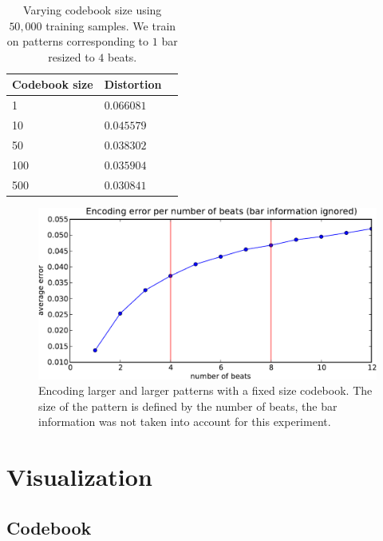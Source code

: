 \documentclass{article}
\begin{document}
\begin{table}
\begin{center}
\begin{tabular}{llc}
\toprule
Codebook size & Distortion \\
\midrule
1 & $0.066081$ \\
10 & $0.045579$ \\
50 & $0.038302$ \\
100 & $0.035904$ \\
500 & $0.030841$ \\
\bottomrule
\end{tabular}
\end{center}
\caption{\small{Varying codebook size using $50,000$ training samples.
    We train on patterns corresponding to $1$ bar resized to $4$ beats.
  }}
\label{tab:cbsize}
\end{table}


\begin{figure}[htb]
\begin{center}
\includegraphics[width=.8\columnwidth]{encoding_per_beat}
\end{center}
\caption{\small{Encoding larger and larger patterns with a fixed size
codebook. The size of the pattern is defined by the number of beats,
the bar information was not taken into account for this experiment.
}}
\label{fig:perbeat}
\end{figure}


\section{Visualization} \label{sec:visu}


\subsection{Codebook}\label{sec:codebook}
\end{document}
